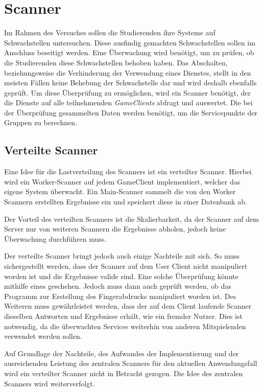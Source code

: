 \section{Scanner} \label{sec:Scanner}
Im Rahmen des Versuches sollen die Studierenden ihre Systeme auf Schwachstellen untersuchen. Diese ausfindig gemachten Schwachstellen sollen im Anschluss beseitigt werden. Eine Überwachung wird benötigt, um zu prüfen, ob die Studierenden diese Schwachstellen behoben haben. Das Abschalten, beziehungsweise die Verhinderung der Verwendung eines Dienstes, stellt in den meisten Fällen keine Behebung der Schwachstelle dar und wird deshalb ebenfalls geprüft. Um diese Überprüfung zu ermöglichen, wird ein Scanner benötigt, der die Dienste auf alle teilnehmenden \textit{GameClients} abfragt und auswertet. Die bei der Überprüfung gesammelten Daten werden benötigt, um die Servicepunkte der Gruppen zu berechnen.

\subsection{Verteilte Scanner}
Eine Idee für die Lastverteilung des Scanners ist ein verteilter Scanner. Hierbei wird ein Worker-Scanner auf jedem GameClient implementiert, welcher das eigene System überwacht. Ein Main-Scanner sammelt die von den Worker Scannern erstellten Ergebnisse ein und speichert diese in einer Datenbank ab. 

Der Vorteil des verteilten Scanners ist die Skalierbarkeit, da der Scanner auf dem Server nur von weiteren Scannern die Ergebnisse abholen, jedoch keine Überwachung durchführen muss.

Der verteilte Scanner bringt jedoch auch einige Nachteile mit sich. So muss sichergestellt werden, dass der Scanner auf dem User Client nicht manipuliert worden ist und die Ergebnisse valide sind. Eine solche Überprüfung könnte mithilfe eines  geschehen. Jedoch muss dann auch geprüft werden, ob das Programm zur Erstellung des Fingerabdrucks manipuliert worden ist.   Des Weiteren muss gewährleistet werden, dass der auf dem Client laufende Scanner dieselben Antworten und Ergebnisse erhält, wie ein fremder Nutzer. Dies ist notwendig, da die überwachten Services weiterhin von anderen Mitspielenden verwendet werden sollen.

Auf Grundlage der Nachteile, des Aufwandes der Implementierung und der ausreichenden Leistung des zentralen Scanners für den aktuellen Anwendungsfall wird ein verteilter Scanner nicht in Betracht gezogen. Die Idee des zentralen Scanners wird weiterverfolgt.

